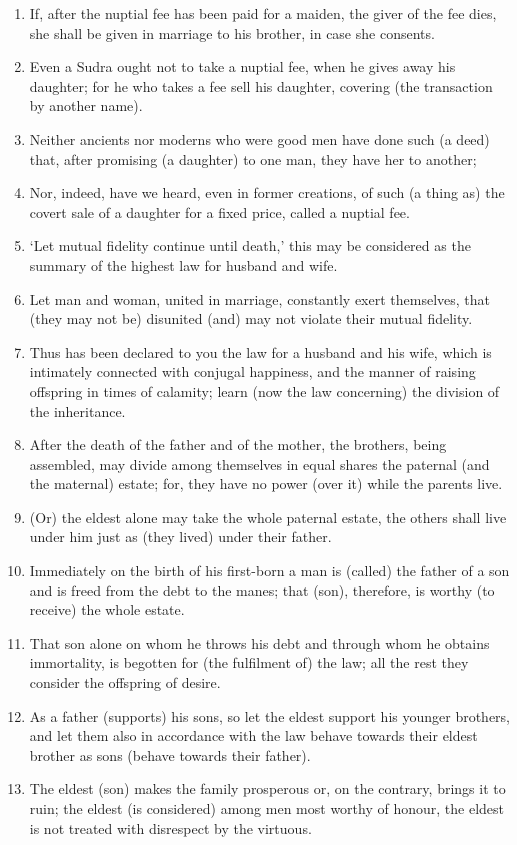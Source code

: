 \begin{enumerate}
\item If, after the nuptial fee has been paid for a maiden, the giver of the fee dies, she shall be given in marriage to his brother, in case she consents.
\item Even a Sudra ought not to take a nuptial fee, when he gives away his daughter; for he who takes a fee sell his daughter, covering (the transaction by another name).
\item Neither ancients nor moderns who were good men have done such (a deed) that, after promising (a daughter) to one man, they have her to another;
\item Nor, indeed, have we heard, even in former creations, of such (a thing as) the covert sale of a daughter for a fixed price, called a nuptial fee.
\item `Let mutual fidelity continue until death,' this may be considered as the summary of the highest law for husband and wife.
\item Let man and woman, united in marriage, constantly exert themselves, that (they may not be) disunited (and) may not violate their mutual fidelity.
\item Thus has been declared to you the law for a husband and his wife, which is intimately connected with conjugal happiness, and the manner of raising offspring in times of calamity; learn (now the law concerning) the division of the inheritance.
\item After the death of the father and of the mother, the brothers, being assembled, may divide among themselves in equal shares the paternal (and the maternal) estate; for, they have no power (over it) while the parents live.
\item (Or) the eldest alone may take the whole paternal estate, the others shall live under him just as (they lived) under their father.
\item Immediately on the birth of his first-born a man is (called) the father of a son and is freed from the debt to the manes; that (son), therefore, is worthy (to receive) the whole estate.
\item That son alone on whom he throws his debt and through whom he obtains immortality, is begotten for (the fulfilment of) the law; all the rest they consider the offspring of desire.
\item As a father (supports) his sons, so let the eldest support his younger brothers, and let them also in accordance with the law behave towards their eldest brother as sons (behave towards their father).
\item The eldest (son) makes the family prosperous or, on the contrary, brings it to ruin; the eldest (is considered) among men most worthy of honour, the eldest is not treated with disrespect by the virtuous.

\end{enumerate}

